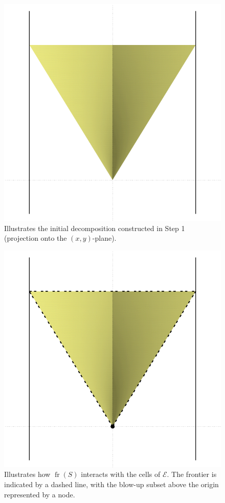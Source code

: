 \documentclass[
]{book}
\theoremstyle{definition}
\theoremstyle{definition}
\theoremstyle{definition}
\theoremstyle{definition}
\theoremstyle{remark}
\begin{document}
\begin{figure}

{\centering \includegraphics[width=0.6\linewidth]{gnuplot/r3-initial} 

}

\caption{Illustrates the initial decomposition constructed in Step 1 (projection onto the $(x,y)$-plane).}\label{fig:initial-cad}
\end{figure}

\begin{figure}

{\centering \includegraphics[width=0.6\linewidth]{gnuplot/r3-initial-fr} 

}

\caption{Illustrates how ${\operatorname{fr} \left( S \right)}$ interacts with the cells of $\mathcal{E}$. The frontier is indicated by a dashed line, with the blow-up subset above the origin represented by a node.}\label{fig:initial-fr}
\end{figure}
\end{document}
